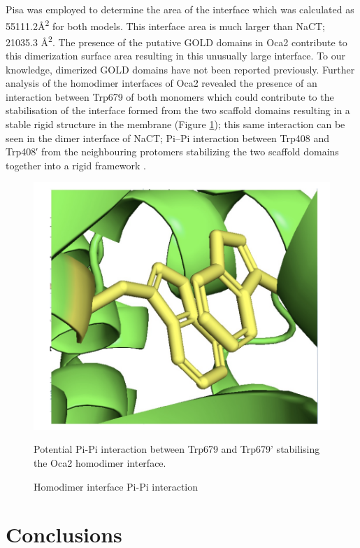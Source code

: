 				 

Pisa \cite{krissinel2007inference} was employed to determine the area of the interface which was calculated as 55111.2Å\textsuperscript{2}  for both models.  This interface area is much larger than NaCT; 21035.3 Å\textsuperscript{2}.  The presence of the putative GOLD domains in Oca2 contribute to this dimerization surface area resulting in this unusually large interface.  To our knowledge, dimerized GOLD domains have not been reported previously.   Further analysis of the homodimer interfaces of Oca2 revealed the presence of an interaction between Trp679 of both monomers which could contribute to the stabilisation of the interface formed from the two scaffold domains resulting in a stable rigid structure in the membrane (Figure \ref{fig:oca2_11}); this same interaction can be seen in the dimer interface of NaCT; Pi–Pi interaction between Trp408 and Trp408′ from the neighbouring protomers stabilizing the two scaffold domains together into a rigid framework \cite{sauer2021structure}.

 \begin{figure}[th!]
    \centering
    \includegraphics[width=150mm, scale=0.75]{oca2/oca2_11.png}
    \caption{Homodimer interface Pi-Pi interaction}
    \label{fig:oca2_11}
    \small
    Potential Pi-Pi interaction between Trp679 and Trp679’ stabilising the Oca2 homodimer interface.
\end{figure}




\section{Conclusions}

